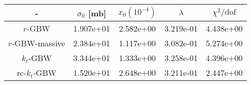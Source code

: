 \begin{tabular}{|c|c|c|c|c|}
\hline - & $\sigma_0 $ [mb] & $x_0 \left(10^{-4}\right)$ & $\lambda$ & $\chi^2/\mathrm{dof}$ \\\hline 
{\footnotesize $r$-GBW} & 1.907e+01& 2.582e+00& 3.219e-01& 4.438e+00\\\hline 
{\footnotesize $r$-GBW-massive} & 2.384e+01& 1.117e+00& 3.082e-01& 5.274e+00\\\hline 
{\footnotesize $k_t$-GBW} & 3.344e+01& 1.333e+00& 3.258e-01& 4.396e+00\\\hline 
{\footnotesize rc-$k_t$-GBW} & 1.520e+01& 2.648e+00& 3.211e-01& 2.447e+00\\\hline 
\end{tabular}